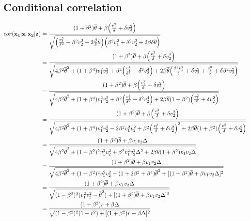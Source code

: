 \documentclass[12pt]{article}
\begin{document}
\subsection{Conditional correlation}\label{conditional-correlation}

\begin{align} \label{eq:cond-corr}
cor(\mathbf{x_1|z, x_2|z})
&=
\frac{
  (1 + \beta^2) \overline{\theta} +
  \beta \Bigl (\frac{v_1^2}{\delta} + \delta v_2^2 \Bigr)
}{
\sqrt{
  \Bigl (\frac{v^2_1}{\delta^2} + \beta^2 v^2_2
  + 2 \frac{\beta}{\delta} \overline{\theta} \Bigr)
  \Bigl (\beta^2 v_1^2 + \delta^2 v^2_2 + 2 \beta \delta
  \overline{\theta} \Big)
}} \nonumber \\
&=
\frac{
  (1 + \beta^2) \overline{\theta} +
  \beta \Bigl (\frac{v_1^2}{\delta} + \delta v_2^2 \Bigr)
}{
\sqrt{
  4 \beta^2 \overline{\theta}^2
  + (1 + \beta^4) v_1^2 v_2^2
  + \beta^2 \Bigl (\frac{v_1^4}{\delta^2} + \delta^2 v_2^4 \Bigr)
  + 2 \beta \overline{\theta}
  \Bigr (\frac{\beta^2 v_1^2}{\delta} + \delta v_2^2
         + \frac{v^2_1}{\delta} + \delta \beta^2 v^2_2
  \Bigl )
}} \nonumber \\
&=
\frac{
  (1 + \beta^2) \overline{\theta} +
  \beta \Bigl (\frac{v_1^2}{\delta} + \delta v_2^2 \Bigr)
}{
\sqrt{
  4 \beta^2 \overline{\theta}^2
  + (1 + \beta^4) v_1^2 v_2^2
  + \beta^2 \Bigl (\frac{v_1^4}{\delta^2} + \delta^2 v_2^4 \Bigr)
  + 2 \beta \overline{\theta} (1 + \beta^2)
  \Bigr (
  \frac{v_1^2}{\delta} + \delta v_2^2
  \Bigl )
}} \nonumber \\
&=
\frac{
  (1 + \beta^2) \overline{\theta} +
  \beta \Bigl (\frac{v_1^2}{\delta} + \delta v_2^2 \Bigr)
}{
\sqrt{
  4 \beta^2 \overline{\theta}^2
  + (1 + \beta^4) v_1^2 v_2^2
  - 2 \beta^2 v_1^2 v_2^2
  + \beta^2 \Bigl (  \frac{v_1^2}{\delta} + \delta v_2^2 \Bigr )^2
  + 2 \beta \overline{\theta} (1 + \beta^2)
  \Bigr (
  \frac{v_1^2}{\delta} + \delta v_2^2
  \Bigl )
}} \nonumber \\
&=
\frac{
  (1 + \beta^2) \overline{\theta} + \beta v_1 v_2 \Delta
}{
\sqrt{
  4 \beta^2 \overline{\theta}^2
  + (1 - \beta^2)^2 v_1^2 v_2^2
  + \beta^2 v_1^2 v_2^2 \Delta^2
  + 2 \beta \overline{\theta} (1 + \beta^2) v_1 v_2 \Delta
}} \nonumber \\
&=
\frac{
  (1 + \beta^2) \overline{\theta} + \beta v_1 v_2 \Delta
}{
\sqrt{
  4 \beta^2 \overline{\theta}^2
  + (1 - \beta^2)^2 v_1^2 v_2^2
  - (1 + 2\beta^2 + \beta^4) \overline{\theta}^2
  + [(1 + \beta^2) \overline{\theta} + \beta v_1 v_2 \Delta] ^ 2
}} \nonumber \\
&=
\frac{
  (1 + \beta^2) \overline{\theta} + \beta v_1 v_2 \Delta
}{
\sqrt{
  (1 - \beta^2)^2 (v_1^2 v_2^2 - \overline{\theta}^2)
  + [(1 + \beta^2) \overline{\theta} + \beta v_1 v_2 \Delta] ^ 2
}} \nonumber \\
&=
\frac{
  (1 + \beta^2) r + \beta \Delta
}{
\sqrt{
  (1 - \beta^2)^2 (1 - r^2)
  + [(1 + \beta^2) r + \beta \Delta] ^ 2
}}
\end{align}
\end{document}
